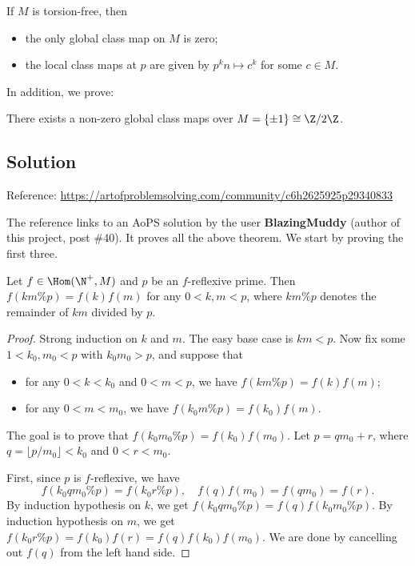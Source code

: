 \begin{theorem}\label{2020n5-main3}
If $M$ is torsion-free, then
\begin{itemize}
    \item   the only global class map on $M$ is zero;
    \item   the local class maps at $p$ are given by $p^k n \mapsto c^k$ for some $c \in M$.
\end{itemize}
\end{theorem}

In addition, we prove:

\begin{theorem}\label{2020n5-main4}
There exists a non-zero global class maps over $M = \{\pm 1\} \cong \Z/2\Z$.
\end{theorem}





\subsection*{Solution}

Reference: \url{https://artofproblemsolving.com/community/c6h2625925p29340833}

The reference links to an AoPS solution by the user \textbf{BlazingMuddy} (author of this project, post \#40).
It proves all the above theorem.
We start by proving the first three.

\begin{lemma}\label{2020n5-1}
Let $f \in \Hom(\N^+, M)$ and $p$ be an $f$-reflexive prime.
Then $f(km \% p) = f(k) f(m)$ for any $0 < k, m < p$, where $km \% p$ denotes the remainder of $km$ divided by $p$.
\end{lemma}
\begin{proof}
Strong induction on $k$ and $m$.
The easy base case is $km < p$.
Now fix some $1 < k_0, m_0 < p$ with $k_0 m_0 > p$, and suppose that
\begin{itemize}
    \item   for any $0 < k < k_0$ and $0 < m < p$, we have $f(km \% p) = f(k) f(m)$;
    \item   for any $0 < m < m_0$, we have $f(k_0 m \% p) = f(k_0) f(m)$.
\end{itemize}

The goal is to prove that $f(k_0 m_0 \% p) = f(k_0) f(m_0)$.
Let $p = q m_0 + r$, where $q = \lfloor p/m_0 \rfloor < k_0$ and $0 < r < m_0$.

First, since $p$ is $f$-reflexive, we have
\[ f(k_0 q m_0 \% p) = f(k_0 r \% p), \quad f(q) f(m_0) = f(q m_0) = f(r). \]
By induction hypothesis on $k$, we get $f(k_0 q m_0 \% p) = f(q) f(k_0 m_0 \% p)$.
By induction hypothesis on $m$, we get $f(k_0 r \% p) = f(k_0) f(r) = f(q) f(k_0) f(m_0)$.
We are done by cancelling out $f(q)$ from the left hand side.
\end{proof}

